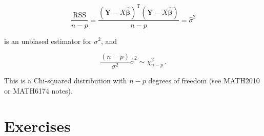 \documentclass[
]{book}
\theoremstyle{definition}
\theoremstyle{definition}
\theoremstyle{definition}
\theoremstyle{definition}
\theoremstyle{remark}
\begin{document}
\begin{equation*}
\frac{\textrm{RSS}}{n-p}=\frac{(\boldsymbol{Y}-X\hat{\boldsymbol{\beta}})^{\textrm{T}}(\boldsymbol{Y}-X\hat{\boldsymbol{\beta}})}{n-p}=\hat{\sigma}^{2}
\end{equation*}

is an unbiased estimator for \(\sigma^{2}\), and

\begin{equation*}
\frac{(n-p)}{\sigma^{2}}\hat{\sigma}^{2}\sim\chi^{2}_{n-p}\,.
\end{equation*}

This is a Chi-squared distribution with \(n-p\) degrees of freedom (see MATH2010 or MATH6174 notes).

\hypertarget{exercises}{%
\section{Exercises}\label{exercises}}
\end{document}

